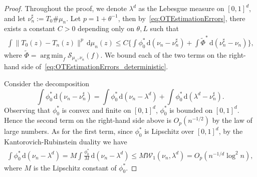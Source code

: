 \documentclass[11pt]{article}
\DeclareMathOperator*{\argmin}{arg\,min}
\begin{document}
\begin{proof}
Throughout the proof, we denote $\lambda^d$ as the Lebesgue measure on $[0, 1]^d$, and let $\nu_n^\sharp:=T_0 \# {\mu}_n$. Let $p=1+\theta^{-1}$, then by~\eqref{eq:OTEstimationErrors}, there exists a constant $C >0$ depending only on $\theta, L$ such that
\begin{align}
\int \|T_0(z) -  {T}_n(z)\|^{p}  \, \mathrm{d}{\mu}_n(z) \leq C \biggl\{\int \phi_0^*\, \mathrm{d}( \nu_n - \nu_n^\sharp) + \int \tilde{\Phi}^* \, \mathrm{d}(\nu_n^\sharp -  \nu_n)\biggr\}, \label{eq:OTEstimationErrors_deterministic}
\end{align}
where $\tilde{\Phi} = \argmin_f \mathcal{S}_{{\mu}_n, {\nu}_n}(f)$. We bound each of the two terms on the right-hand side of~\eqref{eq:OTEstimationErrors_deterministic}. 

Consider the decomposition
\[
\int \phi_0^*\, \mathrm{d}( \nu_n - \nu_n^\sharp) = \int \phi_0^*\, \mathrm{d}( \nu_n - \lambda^d) + \int \phi_0^*\, \mathrm{d}(\lambda^d - \nu_n^\sharp).
\]
Observing that $\phi_0^*$ is convex and finite on $[0, 1]^d$, $\phi_0^*$ is bounded on $[0, 1]^d$. Hence the second term on the right-hand side above is $O_p(n^{-1/2})$ by the law of large numbers. As for the first term, since $\phi_0^*$ is Lipschitz over $[0, 1]^d$, by the Kantorovich-Rubinstein duality \citep[Theorem~1.14]{villani2009optimal} we have 
\begin{align}
    \int \phi_0^* \, \mathrm{d} ({\nu}_n - \lambda^d) = M \int \frac{\phi_0^*}{M} \, \mathrm{d}({\nu}_n - \lambda^d) \leq M \mathcal{W}_1({\nu}_n, \lambda^d) = O_p(n^{-1/d} \log^2 n), \label{eq:FirstTermOTError}
\end{align}
where $M$ is the Lipschitz constant of $\phi_0^*$.


\end{proof}
\end{document}
